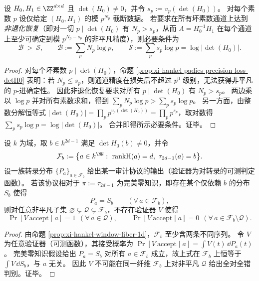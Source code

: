 \begin{corollary}\label{cor:xi-hankel-padics-global-budget-detH0}
设 \(H_0,H_1\in \ZZ^{d\times d}\) 且 \(\det(H_0)\neq 0\)，并令
\(
s_p:=v_p(\det(H_0))
\)。
对每个素数 \(p\) 设仅给定 \((H_0,H_1)\) 的模 \(p^{N_p}\) 截断数据。
若要求在所有坏素数通道上达到 \emph{非退化恢复}（即对一切 \(p\mid \det(H_0)\) 有 \(N_p>s_p\)，从而 \(A=H_0^{-1}H_1\) 在每个通道上至少可确定到模 \(p^{N_p-s_p}\) 的非平凡精度），则必要条件为
\[
\mathcal B\ >\ \mathcal S,
\qquad
\mathcal B:=\sum_{p} N_p\log p,
\qquad
\mathcal S:=\sum_{p} s_p\log p=\log|\det(H_0)|.
\]
\end{corollary}
\begin{proof}
对每个坏素数 \(p\mid \det(H_0)\)，命题 \ref{prop:xi-hankel-padics-precision-loss-detH0} 表明：若 \(N_p\le s_p\)，则通道精度在损失后不超过 \(p^{0}\) 级别，无法获得非平凡的 \(p\)-进确定性。
因此非退化恢复要求对所有 \(p\mid \det(H_0)\) 有 \(N_p>s_p\)。
两边乘以 \(\log p\) 并对所有素数求和，得到
\(
\sum_p N_p\log p>\sum_p s_p\log p
\)。
另一方面，由整数分解恒等式 \(|\det(H_0)|=\prod_p p^{v_p(\det(H_0))}=\prod_p p^{s_p}\)，取对数得 \(\sum_p s_p\log p=\log|\det(H_0)|\)。
合并即得所示必要条件。证毕。
\end{proof}

\begin{theorem}\label{thm:xi-hankel-window-2dminus1-perfect-zk-indistinguishability}
设 \(k\) 为域，取 \(b\in k^{2d-1}\) 满足 \(\det H_0(b)\neq 0\)，并令
\[
\mathcal F_b:=\bigl\{a\in k^{\NN}:\ \mathrm{rankH}(a)=d,\ \tau_{2d-1}(a)=b\bigr\}.
\]
设一族转录分布 \(\{P_a\}_{a\in\mathcal F_b}\) 给出某一审计协议的输出（验证器为对转录的可测判定函数）。
若该协议相对于 \(\pi:=\tau_{2d-1}\) 为完美零知识，即存在某个仅依赖 \(b\) 的分布 \(S_b\) 使得
\[
P_a=S_b\qquad(\forall\,a\in\mathcal F_b),
\]
则对任意非平凡子集 \(\varnothing\subsetneq \mathcal Q\subsetneq \mathcal F_b\)，不存在验证器 \(V\) 使得
\[
\Pr[V\ \mathrm{accept}\mid a]=1\ \ (\forall\,a\in\mathcal Q),
\qquad
\Pr[V\ \mathrm{accept}\mid a]=0\ \ (\forall\,a\in\mathcal F_b\setminus\mathcal Q).
\]
\end{theorem}
\begin{proof}
由命题 \ref{prop:xi-hankel-window-fiber-1d}，\(\mathcal F_b\) 至少含两条不同序列。
令 \(V\) 为任意验证器（可测函数），其接受概率为
\(
\Pr[V\ \mathrm{accept}\mid a]=\int V(t)\,\dd P_a(t)
\)。
完美零知识假设给出 \(P_a=S_b\) 对所有 \(a\in\mathcal F_b\) 成立，故上式在 \(\mathcal F_b\) 上恒等于 \(\int V\,\dd S_b\)，与 \(a\) 无关。
因此 \(V\) 不可能在同一纤维 \(\mathcal F_b\) 上对非平凡 \(\mathcal Q\) 给出全对全错判别。证毕。
\end{proof}

